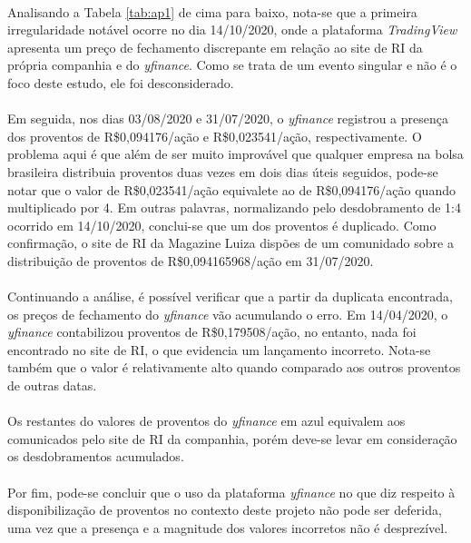 \paragraph{} Analisando a Tabela \ref{tab:ap1} de cima para baixo, nota-se que a primeira irregularidade notável ocorre no dia 14/10/2020, onde a plataforma \textit{TradingView} apresenta um preço de fechamento discrepante em relação ao site de RI da própria companhia e do \textit{yfinance}. Como se trata de um evento singular e não é o foco deste estudo, ele foi desconsiderado.

\paragraph{} Em seguida, nos dias 03/08/2020 e 31/07/2020, o \textit{yfinance} registrou a presença dos proventos de R\$0,094176/ação e R\$0,023541/ação, respectivamente. O problema aqui é que além de ser muito improvável que qualquer empresa na bolsa brasileira distribuia proventos duas vezes em dois dias úteis seguidos, pode-se notar que o valor de R\$0,023541/ação equivalete ao de R\$0,094176/ação quando multiplicado por 4. Em outras palavras, normalizando pelo desdobramento de 1:4 ocorrido em 14/10/2020, conclui-se que um dos proventos é duplicado. Como confirmação, o site de RI da Magazine Luiza dispões de um comunidado sobre a distribuição de proventos de R\$0,094165968/ação em 31/07/2020.

\paragraph{} Continuando a análise, é possível verificar que a partir da duplicata encontrada, os preços de fechamento do \textit{yfinance} vão acumulando o erro. Em 14/04/2020, o \textit{yfinance} contabilizou proventos de R\$0,179508/ação, no entanto, nada foi encontrado no site de RI, o que evidencia um lançamento incorreto. Nota-se também que o valor é relativamente alto quando comparado aos outros proventos de outras datas.

\paragraph{} Os restantes do valores de proventos do \textit{yfinance} em azul equivalem aos comunicados pelo site de RI da companhia, porém deve-se levar em consideração os desdobramentos acumulados.

\paragraph{} Por fim, pode-se concluir que o uso da plataforma \textit{yfinance} no que diz respeito à disponibilização de proventos no contexto deste projeto não pode ser deferida, uma vez que a presença e a magnitude dos valores incorretos não é desprezível.


